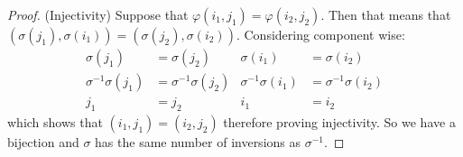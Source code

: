 \documentclass{article}
\begin{document}
\begin{proof}
        (Injectivity) Suppose that $\varphi(i_{1}, j_{1}) = \varphi(i_{2}, j_{2})$. Then that means that $(\sigma(j_{1}), \sigma(i_{1})) = (\sigma(j_{2}), \sigma(i_{2}))$. Considering component wise:
            \begin{align*}
                \sigma(j_{1})            &= \sigma(j_{2})            & \sigma(i_{1})            &= \sigma(i_{2})            \\
                \sigma^{-1}\sigma(j_{1}) &= \sigma^{-1}\sigma(j_{2}) & \sigma^{-1}\sigma(i_{1}) &= \sigma^{-1}\sigma(i_{2}) \\
                j_{1}                    &= j_{2}                    & i_{1}                    &= i_{2}                      
            \end{align*}
        which shows that $(i_{1}, j_{1}) = (i_{2}, j_{2})$ therefore proving injectivity. So we have a bijection and $\sigma$ has the same number of inversions as $\sigma^{-1}$.
    \end{proof}
\end{document}
